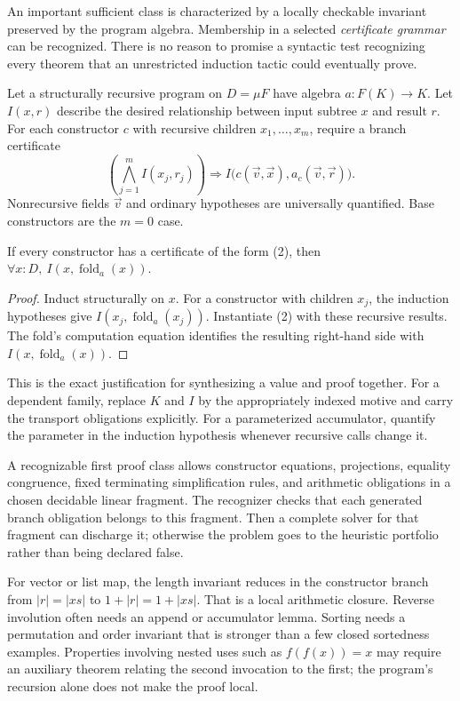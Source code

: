 \ans An important sufficient class is characterized by a locally checkable invariant preserved by the program algebra. Membership in a selected \emph{certificate grammar} can be recognized. There is no reason to promise a syntactic test recognizing every theorem that an unrestricted induction tactic could eventually prove.

Let a structurally recursive program on $D=\mu F$ have algebra $a:F(K)\to K$. Let $I(x,r)$ describe the desired relationship between input subtree $x$ and result $r$. For each constructor $c$ with recursive children $x_1,\ldots,x_m$, require a branch certificate
\[
 \left(\bigwedge_{j=1}^{m} I(x_j,r_j)\right)
 \Longrightarrow
 I\bigl(c(\vec v,\vec x),a_c(\vec v,\vec r)\bigr). \tag{2}
\]
Nonrecursive fields $\vec v$ and ordinary hypotheses are universally quantified. Base constructors are the $m=0$ case.

\begin{theorem}
If every constructor has a certificate of the form (2), then
$\forall x:D,\ I(x,\operatorname{fold}_a(x))$.
\end{theorem}
\begin{proof}
Induct structurally on $x$. For a constructor with children $x_j$, the induction hypotheses give $I(x_j,\operatorname{fold}_a(x_j))$. Instantiate (2) with these recursive results. The fold's computation equation identifies the resulting right-hand side with $I(x,\operatorname{fold}_a(x))$.
\end{proof}

This is the exact justification for synthesizing a value and proof together. For a dependent family, replace $K$ and $I$ by the appropriately indexed motive and carry the transport obligations explicitly. For a parameterized accumulator, quantify the parameter in the induction hypothesis whenever recursive calls change it.

A recognizable first proof class allows constructor equations, projections, equality congruence, fixed terminating simplification rules, and arithmetic obligations in a chosen decidable linear fragment. The recognizer checks that each generated branch obligation belongs to this fragment. Then a complete solver for that fragment can discharge it; otherwise the problem goes to the heuristic portfolio rather than being declared false.

For vector or list map, the length invariant reduces in the constructor branch from $|r|=|xs|$ to $1+|r|=1+|xs|$. That is a local arithmetic closure. Reverse involution often needs an append or accumulator lemma. Sorting needs a permutation and order invariant that is stronger than a few closed sortedness examples. Properties involving nested uses such as $f(f(x))=x$ may require an auxiliary theorem relating the second invocation to the first; the program's recursion alone does not make the proof local.

